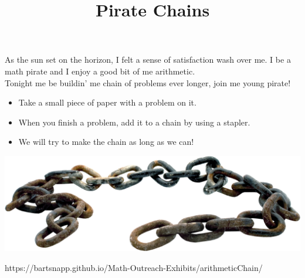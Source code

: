 \documentclass{../exhibit}
\title{Pirate Chains}
\begin{document}
\begin{context}
  As the sun set on the horizon, I felt a sense of satisfaction wash
  over me. I be a math pirate and I enjoy a good bit of me
  arithmetic.
  \\[1cm]
  Tonight me be buildin' me chain of
  problems ever longer, join me young pirate!
\end{context}

\begin{directions}
  \begin{itemize}
\item Take a small piece of paper with a problem on it.
\item When you finish a problem, add it to a chain by using a stapler.
\item We will try to make the chain as long as we can!
\end{itemize}
\end{directions}

\begin{example}
  \begin{center}
    \includegraphics[width=.9\textwidth]{chain.png}
  \end{center}
\end{example}

\begin{mathConnections}
  https://bartsnapp.github.io/Math-Outreach-Exhibits/arithmeticChain/
\end{mathConnections}
\end{document}

